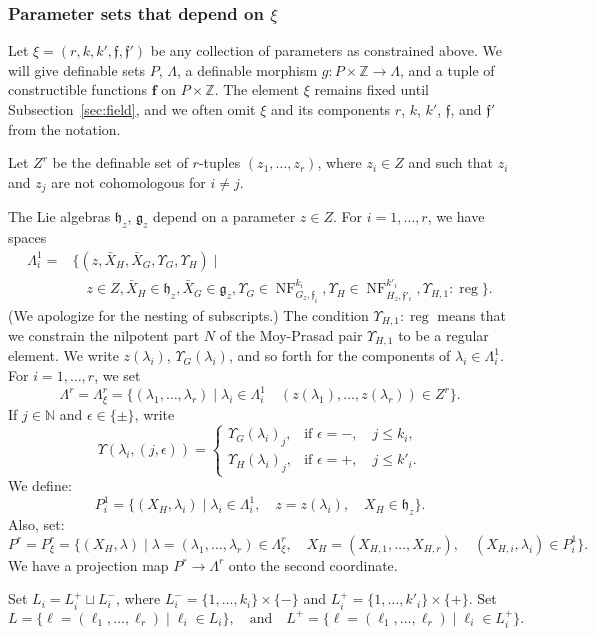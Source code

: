 \documentclass[12pt]{amsart}
\newcommand{\op}[1]{\operatorname{#1}}
\newcommand{\ring}[1]{{\mathbb #1}}
\def\NF{\op{NF}}
\def\Y{\Upsilon}
\def\s{{\mathfrak{f}}}
\def\bf{\mathbf f}
\newcommand{\fg}{\mathfrak{g}}
\newcommand{\fh}{\mathfrak{h}}
\theoremstyle{plain}
\theoremstyle{definition}
\begin{document}
\subsubsection{Parameter sets that depend on $\xi$}

Let $\xi=(r,k,k',\s,\s')$ be any collection of parameters as
constrained above.  We will give definable sets $P$, $\Lambda$, a
definable morphism $g:P\times\ring{Z}\to \Lambda$, and a tuple of
constructible functions $\bf$ on $P\times\ring{Z}$.  The element $\xi$
remains fixed until Subsection~\ref{sec:field}, and we often omit
$\xi$ and its components $r$, $k$, $k'$, $\s$, and $\s'$ from the
notation.

Let $Z^r$ be the definable
set of $r$-tuples $(z_1,\ldots,z_r)$, where $z_i \in Z$ and such
that $z_i$ and $z_j$ are not cohomologous for $i\ne j$.  

The Lie algebras $\fh_z$, $\fg_z$ depend on a parameter $z\in Z$.
For $i=1,\ldots,r$, we have spaces
\begin{align*}
\Lambda^1_i = &\{(z,\bar X_H,\bar X_G,\Y_G,\Y_H) \mid \\
     &\quad z\in Z, 
\bar X_H \in \fh_z, \bar X_G\in \fg_z, 
\Y_G\in \NF^{k_i}_{G_z,\s_i}, \Y_H\in \NF^{k'_i}_{H_z,\s'_i}, \Y_{H,1}:\op{reg}\}.
\end{align*}
(We apologize for the nesting of subscripts.)  The condition
$\Y_{H,1}:\op{reg}$ means that we constrain the nilpotent part $N$ of
the Moy-Prasad pair $\Y_{H,1}$ to be a regular element.  We write
$z(\lambda_i)$, $\Y_G(\lambda_i)$, and so forth for the components of
$\lambda_i\in\Lambda^1_i$.  For $i=1,\ldots,r$, we set
\[
\Lambda^r = \Lambda^r_\xi = 
\{(\lambda_1,\ldots,\lambda_r) \mid \lambda_i \in \Lambda^1_i\quad
  (z(\lambda_1),\ldots,z(\lambda_r))\in Z^r \}.
\]
If $j\in\ring{N}$ and $\epsilon\in\{\pm\}$, write
\[
\Y(\lambda_i,(j,\epsilon)) = 
\begin{cases}
\Y_G(\lambda_i)_j,&\text{if }\epsilon= -,\quad j\le k_i,\\
\Y_H(\lambda_i)_j,&\text{if }\epsilon= +,\quad j\le k'_i.
\end{cases}
\]
We
define:
\[
P^1_i = \{(X_H,\lambda_i) \mid \lambda_i\in \Lambda^1_i,
\quad z = z(\lambda_i),\quad X_H \in \fh_z\}.
\]
Also, set:
\[
P^r = P^r_\xi = \{(X_H,\lambda) \mid \lambda = 
(\lambda_1,\ldots,\lambda_r)\in \Lambda^r_\xi,\quad
  X_H = (X_{H,1},\ldots,X_{H,r}), \quad (X_{H,i},\lambda_i) \in P^1_i\}.
\]
We have a projection map $P^r\to \Lambda^r$ onto the second coordinate.

Set
$L_i = L^+_i\sqcup L^-_i$, where $L^-_i =
\{1,\ldots,k_i\}\times\{-\}$ and $L^+_i =
\{1,\ldots,k'_i\}\times\{+\}$.
Set
\[
L = \{\ell = (\ell_1,\ldots,\ell_r)\mid \ell_i\in L_i\},\quad\text{and}\quad
L^+ = \{\ell = (\ell_1,\ldots,\ell_r)\mid \ell_i\in L^+_i\}.
\]
\end{document}
